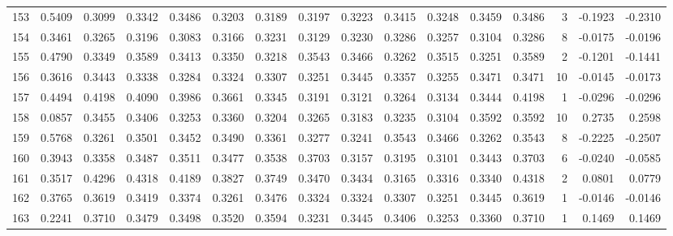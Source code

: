 \begin{tabular}{lrrrrrrrrrrrrrrr}
153 &      0.5409 &  0.3099 &  0.3342 &  0.3486 &  0.3203 &  0.3189 &  0.3197 &  0.3223 &  0.3415 &  0.3248 &   0.3459 &     0.3486 &      3 &                   -0.1923 &                    -0.2310 \\
154 &      0.3461 &  0.3265 &  0.3196 &  0.3083 &  0.3166 &  0.3231 &  0.3129 &  0.3230 &  0.3286 &  0.3257 &   0.3104 &     0.3286 &      8 &                   -0.0175 &                    -0.0196 \\
155 &      0.4790 &  0.3349 &  0.3589 &  0.3413 &  0.3350 &  0.3218 &  0.3543 &  0.3466 &  0.3262 &  0.3515 &   0.3251 &     0.3589 &      2 &                   -0.1201 &                    -0.1441 \\
156 &      0.3616 &  0.3443 &  0.3338 &  0.3284 &  0.3324 &  0.3307 &  0.3251 &  0.3445 &  0.3357 &  0.3255 &   0.3471 &     0.3471 &     10 &                   -0.0145 &                    -0.0173 \\
157 &      0.4494 &  0.4198 &  0.4090 &  0.3986 &  0.3661 &  0.3345 &  0.3191 &  0.3121 &  0.3264 &  0.3134 &   0.3444 &     0.4198 &      1 &                   -0.0296 &                    -0.0296 \\
158 &      0.0857 &  0.3455 &  0.3406 &  0.3253 &  0.3360 &  0.3204 &  0.3265 &  0.3183 &  0.3235 &  0.3104 &   0.3592 &     0.3592 &     10 &                    0.2735 &                     0.2598 \\
159 &      0.5768 &  0.3261 &  0.3501 &  0.3452 &  0.3490 &  0.3361 &  0.3277 &  0.3241 &  0.3543 &  0.3466 &   0.3262 &     0.3543 &      8 &                   -0.2225 &                    -0.2507 \\
160 &      0.3943 &  0.3358 &  0.3487 &  0.3511 &  0.3477 &  0.3538 &  0.3703 &  0.3157 &  0.3195 &  0.3101 &   0.3443 &     0.3703 &      6 &                   -0.0240 &                    -0.0585 \\
161 &      0.3517 &  0.4296 &  0.4318 &  0.4189 &  0.3827 &  0.3749 &  0.3470 &  0.3434 &  0.3165 &  0.3316 &   0.3340 &     0.4318 &      2 &                    0.0801 &                     0.0779 \\
162 &      0.3765 &  0.3619 &  0.3419 &  0.3374 &  0.3261 &  0.3476 &  0.3324 &  0.3324 &  0.3307 &  0.3251 &   0.3445 &     0.3619 &      1 &                   -0.0146 &                    -0.0146 \\
163 &      0.2241 &  0.3710 &  0.3479 &  0.3498 &  0.3520 &  0.3594 &  0.3231 &  0.3445 &  0.3406 &  0.3253 &   0.3360 &     0.3710 &      1 &                    0.1469 &                     0.1469 \\

\end{tabular}
